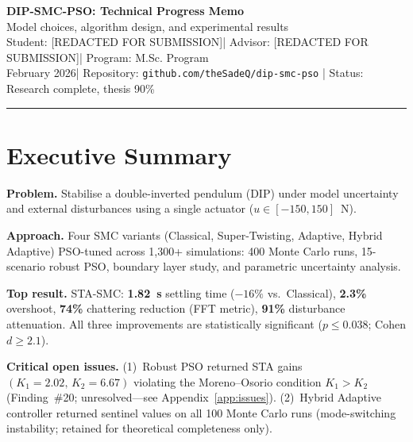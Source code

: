 \documentclass[10pt, a4paper]{article}
\newcommand{\ReportTitle}{DIP-SMC-PSO: Technical Progress Memo}
\newcommand{\ReportSubtitle}{Model choices, algorithm design, and experimental results}
\newcommand{\ReportDate}{February 2026}
\newcommand{\ReportRepo}{github.com/theSadeQ/dip-smc-pso}
\newcommand{\ReportStatus}{Research complete, thesis 90\%}
\newcommand{\StudentName}{[REDACTED FOR SUBMISSION]}
\newcommand{\AdvisorName}{[REDACTED FOR SUBMISSION]}
\newcommand{\ProgramName}{M.Sc. Program}
\newif\ifTwoColumnReport
\newcommand{\ReportColumnSep}{0.75cm}
\newcommand{\ReportBodyFont}{\small}
\begin{document}

\ifTwoColumnReport
  \setlength{\columnsep}{\ReportColumnSep}
  \twocolumn
\fi
\ReportBodyFont

\begin{center}
  {\LARGE\bfseries\color{headblue}
    \ReportTitle}\\[0.4em]
  {\large \ReportSubtitle}\\[0.2em]
  {\small Student: \StudentName \quad|\quad
    Advisor: \AdvisorName \quad|\quad
    Program: \ProgramName}\\[0.2em]
  {\small \ReportDate \quad|\quad
    Repository: \texttt{\ReportRepo} \quad|\quad
    Status: \ReportStatus}
\end{center}
\vspace{-0.5em}
\noindent\textcolor{headblue}{\rule{\linewidth}{1pt}}
\vspace{0.5em}

\section*{Executive Summary}

\textbf{Problem.} Stabilise a double-inverted pendulum (DIP) under model uncertainty
and external disturbances using a single actuator ($u \in [-150,150]$~N).

\textbf{Approach.} Four SMC variants (Classical, Super-Twisting, Adaptive, Hybrid
Adaptive) PSO-tuned across 1,300+ simulations: 400 Monte Carlo runs, 15-scenario
robust PSO, boundary layer study, and parametric uncertainty analysis.

\textbf{Top result.} STA-SMC: \textbf{1.82~s} settling time ($-16\%$ vs.\ Classical),
\textbf{2.3\%} overshoot, \textbf{74\%} chattering reduction (FFT metric),
\textbf{91\%} disturbance attenuation.
All three improvements are statistically significant ($p \le 0.038$; Cohen $d \ge 2.1$).

\textbf{Critical open issues.}
(1)~Robust PSO returned STA gains $(K_1{=}2.02,\, K_2{=}6.67)$ violating the
Moreno--Osorio condition $K_1{>}K_2$ (Finding~\#20; unresolved---see
Appendix~\ref{app:issues}).
(2)~Hybrid Adaptive controller returned sentinel values on all 100 Monte Carlo runs
(mode-switching instability; retained for theoretical completeness only).
\end{document}
